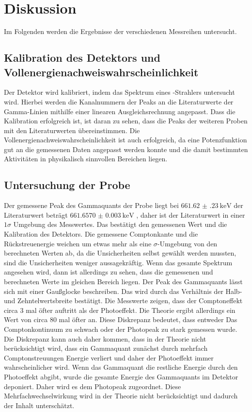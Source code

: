 \section{Diskussion}
\label{sec:Diskussion}
Im Folgenden werden die Ergebnisse der verschiedenen Messreihen untersucht.

\subsection{Kalibration des Detektors und Vollenergienachweiswahrscheinlichkeit}
Der Detektor wird kalibriert, indem das Spektrum eines -Strahlers untersucht wird.
Hierbei werden die Kanalnummern der Peaks an die Literaturwerte \cite{Gamma_lit} der Gamma-Linien mithilfe einer linearen 
Ausgleichsrechnung angepasst. Dass die Kalibration erfolgreich ist, ist daran zu sehen, dass die Peaks der weiteren
Proben mit den Literaturwerten übereinstimmen.
Die Vollenergienachweiswahrscheinlichkeit ist auch erfolgreich, da eine Potenzfunktion gut an die gemessenen Daten angepasst werden konnte und die 
damit bestimmten Aktivitäten in physikalisch sinnvollen Bereichen liegen. 

\subsection{Untersuchung der  Probe}
Der gemessene Peak des Gammaquants der  Probe liegt bei $\SI{661.62(23)}{\kilo\eV}$ der Literaturwert beträgt $\SI{661.6570(30)}{\kilo\eV}$ \cite{Gamma_lit},
daher ist der Literaturwert in einer $1\sigma$ Umgebung des Messwertes. Das bestätigt den gemessenen Wert und die Kalibration des 
Detektors.
Die gemessene Comptonkante und die Rückstreuenergie weichen um etwas mehr als eine $\sigma$-Umgebung von den berechneten Werten ab, da die 
Unsicherheiten selbst gewählt werden mussten, sind die Unsicherheiten weniger aussagekräftig.
Wenn das gesamte Spektrum angesehen wird, dann ist allerdings 
zu sehen, dass die gemessenen und berechneten Werte im gleichen Bereich liegen.
Der Peak des Gammaquants lässt sich mit einer Gaußglocke beschreiben. Das wird durch das Verhältnis der Halb- und Zehntelwertsbreite 
bestätigt. 
Die Messwerte zeigen, dass der Comptoneffekt circa 3 mal öfter auftritt als der Photoeffekt. Die Theorie ergibt allerdings 
ein Wert von circa 80 mal öfter an. Diese Diskrepanz bedeutet, dass entweder Das Comptonkontinuum zu schwach oder der Photopeak
zu stark gemessen wurde. 
Die Diskrepanz kann auch daher kommen, dass in der Theorie nicht berücksichtigt wird, dass ein Gammaquant zunächst durch mehrfach
Comptonstreuungen Energie verliert und daher der Photoeffekt immer wahrscheinlicher wird. Wenn das Gammaquant  
die restliche Energie durch den Photoeffekt abgibt, wurde die gesamte Energie des Gammaquants im Detektor deponiert. Daher wird es 
dem Photopeak zugeordnet. Diese Mehrfachwechselwirkung wird in der Theorie nicht berücksichtigt und dadurch der Inhalt 
unterschätzt.

